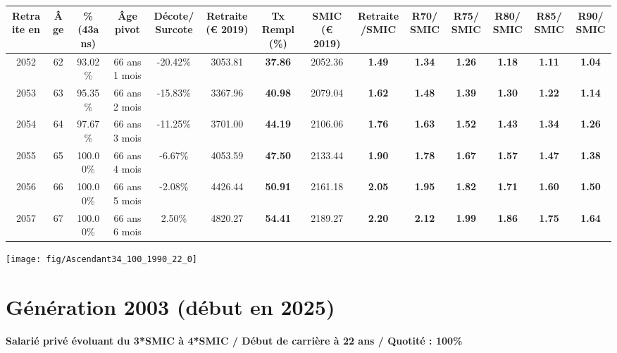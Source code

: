 \begin{adjustbox}{max width=\textwidth} 
\begin{tabular}[htb]{|c|c||c|c|c||c|c||c|c||c|c|c|c|c|} 
\hline 
 Retraite en &  Âge &  \%(43ans) &  Âge pivot &  Décote/Surcote &  Retraite (\euro{} 2019) &  Tx Rempl(\%) &  SMIC (\euro{} 2019) &  Retraite/SMIC &  R70/SMIC &  R75/SMIC &  R80/SMIC &  R85/SMIC &  R90/SMIC \\ 
\hline \hline 
 2052 &  62 &  93.02\% &  66 ans 1 mois &  -20.42\% &  3053.81 &  {\bf 37.86} &  2052.36 &  {\bf 1.49} &  {\bf 1.34} &  {\bf 1.26} &  {\bf 1.18} &  {\bf 1.11} &  {\bf 1.04} \\ 
\hline 
 2053 &  63 &  95.35\% &  66 ans 2 mois &  -15.83\% &  3367.96 &  {\bf 40.98} &  2079.04 &  {\bf 1.62} &  {\bf 1.48} &  {\bf 1.39} &  {\bf 1.30} &  {\bf 1.22} &  {\bf 1.14} \\ 
\hline 
 2054 &  64 &  97.67\% &  66 ans 3 mois &  -11.25\% &  3701.00 &  {\bf 44.19} &  2106.06 &  {\bf 1.76} &  {\bf 1.63} &  {\bf 1.52} &  {\bf 1.43} &  {\bf 1.34} &  {\bf 1.26} \\ 
\hline 
 2055 &  65 &  100.00\% &  66 ans 4 mois &  -6.67\% &  4053.59 &  {\bf 47.50} &  2133.44 &  {\bf 1.90} &  {\bf 1.78} &  {\bf 1.67} &  {\bf 1.57} &  {\bf 1.47} &  {\bf 1.38} \\ 
\hline 
 2056 &  66 &  100.00\% &  66 ans 5 mois &  -2.08\% &  4426.44 &  {\bf 50.91} &  2161.18 &  {\bf 2.05} &  {\bf 1.95} &  {\bf 1.82} &  {\bf 1.71} &  {\bf 1.60} &  {\bf 1.50} \\ 
\hline 
 2057 &  67 &  100.00\% &  66 ans 6 mois &  2.50\% &  4820.27 &  {\bf 54.41} &  2189.27 &  {\bf 2.20} &  {\bf 2.12} &  {\bf 1.99} &  {\bf 1.86} &  {\bf 1.75} &  {\bf 1.64} \\ 
\hline 
\hline 
\end{tabular} 
\end{adjustbox} 
 
 \vspace{0.1cm} 

 {\hspace{-2.2cm}\texttt{[image: fig/Ascendant34\_100\_1990\_22\_0]}} 

\newpage 
 
\section{Génération 2003 (début en 2025)\label{Ascendant34_100_2003_22_0}} 
 
{\bf \noindent Salarié privé évoluant du 3*SMIC à 4*SMIC / Début de carrière à 22 ans / Quotité : 100\%}  ~ 

